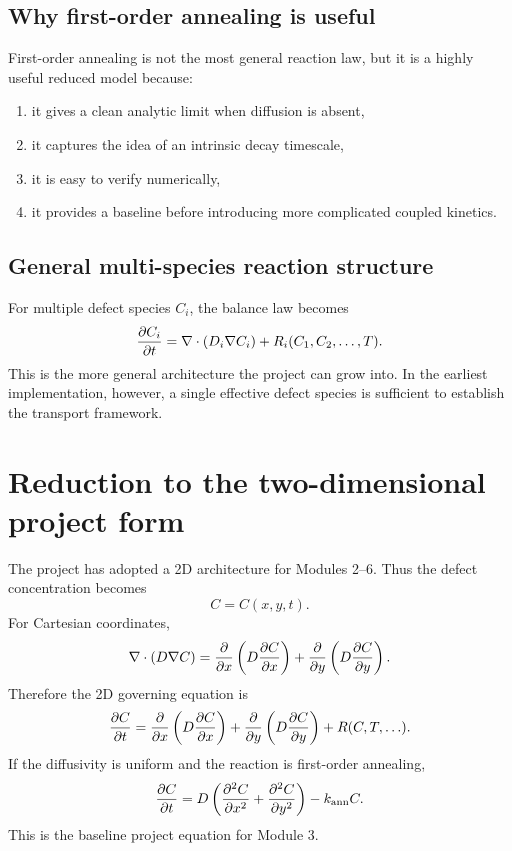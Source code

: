 \documentclass[11pt]{article}
\begin{document}
\subsection{Why first-order annealing is useful}

First-order annealing is not the most general reaction law, but it is a highly useful reduced model because:
\begin{enumerate}[label=\arabic*.]
    \item it gives a clean analytic limit when diffusion is absent,
    \item it captures the idea of an intrinsic decay timescale,
    \item it is easy to verify numerically,
    \item it provides a baseline before introducing more complicated coupled kinetics.
\end{enumerate}

\subsection{General multi-species reaction structure}

For multiple defect species $C_i$, the balance law becomes
\begin{equation}
\pdv{C_i}{t} = \nabla \cdot (D_i \nabla C_i) + R_i(C_1,C_2,\ldots,T).
\end{equation}
This is the more general architecture the project can grow into. In the earliest implementation, however, a single effective defect species is sufficient to establish the transport framework.

\section{Reduction to the two-dimensional project form}

The project has adopted a 2D architecture for Modules 2--6. Thus the defect concentration becomes
\begin{equation}
C = C(x,y,t).
\end{equation}
For Cartesian coordinates,
\begin{equation}
\nabla \cdot (D \nabla C)
= \pdv{}{x}\left(D\pdv{C}{x}\right)
+ \pdv{}{y}\left(D\pdv{C}{y}\right).
\end{equation}
Therefore the 2D governing equation is
\begin{equation}
\pdv{C}{t}
=
\pdv{}{x}\left(D\pdv{C}{x}\right)
+
\pdv{}{y}\left(D\pdv{C}{y}\right)
+ R(C,T,\ldots).
\end{equation}
If the diffusivity is uniform and the reaction is first-order annealing,
\begin{equation}
\pdv{C}{t}
=
D\left(\pdv[2]{C}{x} + \pdv[2]{C}{y}\right) - k_{\mathrm{ann}} C.
\end{equation}
This is the baseline project equation for Module 3.
\end{document}

